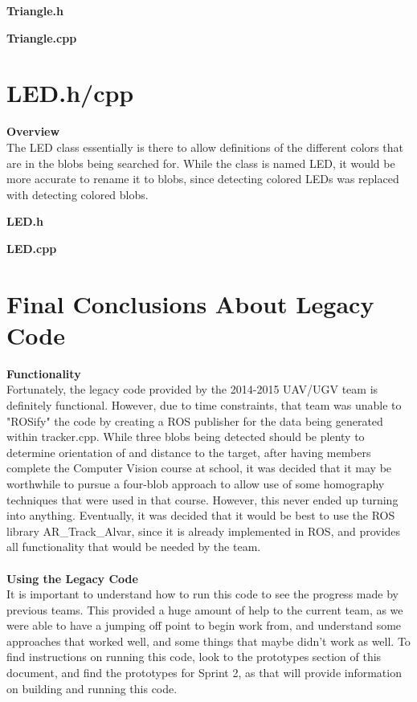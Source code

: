 \documentclass[11pt]{book}
\begin{document}
\large{\textbf{Triangle.h}}

\large{\textbf{Triangle.cpp}}


\section*{LED.h/cpp}
\large{\textbf{Overview}}\\
\normalsize
\noindent The LED class essentially is there to allow definitions of the different colors that are in the blobs being searched for. While the class is named LED, it would be more accurate to rename it to blobs, since detecting colored LEDs was replaced with detecting colored blobs.

\large{\textbf{LED.h}}

\large{\textbf{LED.cpp}}



\section*{Final Conclusions About Legacy Code}
\large{\textbf{Functionality}}\\
\normalsize
\noindent Fortunately, the legacy code provided by the 2014-2015 UAV/UGV team is definitely functional. However, due to time constraints, that team was unable to "ROSify" the code by creating a ROS publisher for the data being generated within tracker.cpp. While three blobs being detected should be plenty to determine orientation of and distance to the target, after having members complete the Computer Vision course at school, it was decided that it may be worthwhile to pursue a four-blob approach to allow use of some homography techniques that were used in that course. However, this never ended up turning into anything. Eventually, it was decided that it would be best to use the ROS library AR\_Track\_Alvar, since it is already implemented in ROS, and provides all functionality that would be needed by the team.\\\\
\large{\textbf{Using the Legacy Code}}\\
\normalsize
\noindent It is important to understand how to run this code to see the progress made by previous teams. This provided a huge amount of help to the current team, as we were able to have a jumping off point to begin work from, and understand some approaches that worked well, and some things that maybe didn't work as well. To find instructions on running this code, look to the prototypes section of this document, and find the prototypes for Sprint 2, as that will provide information on building and running this code. 
\end{document}
